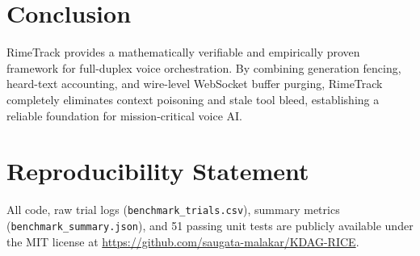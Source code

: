 \documentclass[10pt,journal,compsoc]{IEEEtran}
\theoremstyle{definition}
\begin{document}
\section{Conclusion}
RimeTrack provides a mathematically verifiable and empirically proven framework for full-duplex voice orchestration. By combining generation fencing, heard-text accounting, and wire-level WebSocket buffer purging, RimeTrack completely eliminates context poisoning and stale tool bleed, establishing a reliable foundation for mission-critical voice AI.

\section*{Reproducibility Statement}
All code, raw trial logs (\texttt{benchmark\_trials.csv}), summary metrics (\texttt{benchmark\_summary.json}), and 51 passing unit tests are publicly available under the MIT license at \url{https://github.com/saugata-malakar/KDAG-RICE}.
\end{document}
